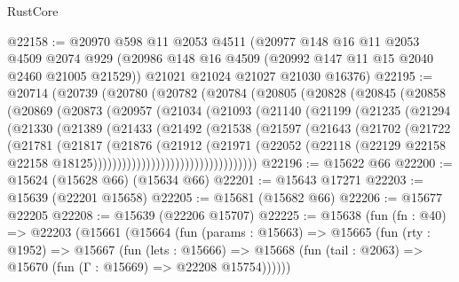 \begin{lexlean}{RustCore}
\begin{coremodule}
@22158 := @20970
    @598
    @11
    @2053
    @4511
    (@20977
      @148
      @16
      @11
      @2053
      @4509
      @2074
      @929
      (@20986 @148 @16 @4509 (@20992 @147 @11 @15 @2040 @2460 @21005 @21529))
      @21021
      @21024
      @21027
      @21030
      @16376)
@22195 := @20714
    (@20739
      (@20780
        (@20782
          (@20784
            (@20805
              (@20828
                (@20845
                  (@20858
                    (@20869
                      (@20873
                        (@20957
                          (@21034
                            (@21093
                              (@21140
                                (@21199
                                  (@21235
                                    (@21294
                                      (@21330
                                        (@21389
                                          (@21433
                                            (@21492
                                              (@21538
                                                (@21597
                                                  (@21643
                                                    (@21702
                                                      (@21722
                                                        (@21781
                                                          (@21817
                                                            (@21876
                                                              (@21912
                                                                (@21971
                                                                  (@22052
                                                                    (@22118
                                                                      (@22129
                                                                        @22158
                                                                        @22158
                                                                        @18125))))))))))))))))))))))))))))))))))
@22196 := @15622 @66
@22200 := @15624 (@15628 @66) (@15634 @66)
@22201 := @15643 @17271
@22203 := @15639 (@22201 @15658)
@22205 := @15681 (@15682 @66)
@22206 := @15677 @22205
@22208 := @15639 (@22206 @15707)
@22225 := @15638
    (fun (fn : @40) =>
    @22203
      (@15661
        (@15664
          (fun (params : @15663) =>
          @15665
            (fun (rty : @1952) =>
            @15667
              (fun (lets : @15666) =>
              @15668 (fun (tail : @2063) => @15670 (fun (Γ : @15669) => @22208 @15754))))))

\end{coremodule}
\end{lexlean}
